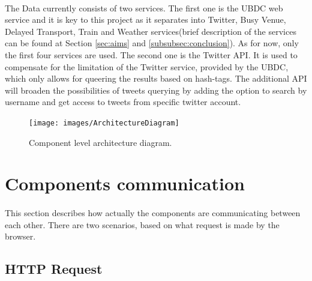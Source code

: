 \documentclass{l4proj}
\begin{document}
\paragraph{}
The Data currently consists of two services. The first one is the UBDC web service and it is key to this project as it separates into Twitter, Busy Venue, Delayed Transport, Train and Weather services(brief description of the services can be found at Section \ref{sec:aims} and \ref{subsubsec:conclusion}). As for now, only the first four services are used. The second one is the Twitter API. It is used to compensate for the limitation of the Twitter service, provided by the UBDC, which only allows for queering the results based on hash-tags. The additional API will broaden the possibilities of tweets querying by adding the option to search by username and get access to tweets from specific twitter account.        
  

\begin{figure}[H]
	\centering
	\texttt{[image: images/ArchitectureDiagram]}
	\caption{Component level architecture diagram.}
	\label{componentDiagram}
\end{figure}

\section{Components communication}
\paragraph{}
This section describes how actually the components are communicating between each other. There are two scenarios, based on what request is made by the browser. 

\subsection{HTTP Request}
\label{sec:http}
\end{document}
